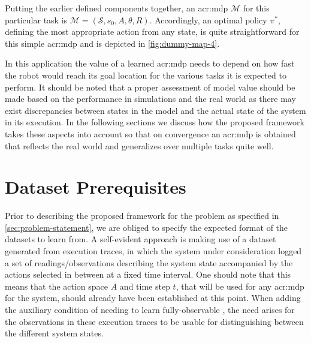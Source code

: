 Putting the earlier defined components together, an \acrshort{acr:mdp} $\mathcal{M}$ for this particular task is $\mathcal{M} = (\mathcal{S}, s_0, A, \theta, R)$.
Accordingly, an optimal policy $\pi^\ast$, defining the most appropriate action from any state, is quite straightforward for this simple \acrshort{acr:mdp} and is depicted in \autoref{fig:dummy-map-4}.

In this application the value of a learned \acrshort{acr:mdp} needs to depend on how fast the robot would reach its goal location for the various tasks it is expected to perform.
It should be noted that a proper assessment of model value should be made based on the performance in simulations and the real world as there may exist discrepancies between states in the model and the actual state of the system in its execution.
In the following sections we discuss how the proposed framework takes these aspects into account so that on convergence an \acrshort{acr:mdp} is obtained that reflects the real world and generalizes over multiple tasks quite well. %


\section{Dataset Prerequisites}
\label{sec:dataset-prerequisites}

Prior to describing the proposed framework for the problem as specified in \autoref{sec:problem-statement}, we are obliged to specify the expected format of the datasets to learn  from.
A self-evident approach is making use of a dataset generated from execution traces, in which the system under consideration logged a set of readings/observations describing the system state accompanied by the actions selected in between at a fixed time interval.
One should note that this means that the action space $A$ and time step $t$, that will be used for any \acrshort{acr:mdp} for the system, should already have been established at this point.
When adding the auxiliary condition of needing to learn fully-observable , the need arises for the observations in these execution traces to be usable for distinguishing between the different system states.

